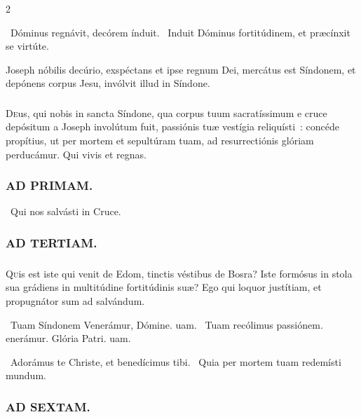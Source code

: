 \documentclass[9pt,twoside]{extarticle}
\begin{document}
\begin{multicols}{2}
\begin{tightlist}{}
\item {}~Dóminus regnávit, decórem índuit. ~Induit Dóminus fortitúdinem, et præcínxit se virtúte.
\item {} Joseph nóbilis decúrio, exspéctans et ipse regnum Dei, mercátus est Síndonem, et depónens corpus Jesu, invólvit illud in Síndone.
\end{tightlist}

\subsubsection*{\center {}}
\lettrine{D}eus, qui nobis in sancta Síndone, qua corpus tuum sacratíssimum e cruce depósitum a Joseph involútum fuit, passiónis tuæ vestígia reliquísti~: concéde propítius, ut per mortem et sepultúram tuam, ad resurrectiónis glóriam perducámur. Qui vivis et regnas.

\subsubsection*{\center \textsc{AD PRIMAM.}}
\noindent {}~Qui nos salvásti in Cruce.

\subsubsection*{\center \textsc{AD TERTIAM.}}
\subsubsection*{}
\lettrine{Q}uis est iste qui venit de Edom, tinctis véstibus de Bosra? Iste formósus in stola sua grádiens in multitúdine fortitúdinis suæ? Ego qui loquor justítiam, et propugnátor sum ad salvándum.

\begin{tightlist}{}
\item {}~Tuam Síndonem \textred{*} Venerámur, Dómine. uam. ~Tuam recólimus passiónem. enerámur. Glória Patri. uam.
\item {}~Adorámus te Christe, et benedícimus tibi. ~Quia per mortem tuam redemísti mundum.
\end{tightlist}

\subsubsection*{\center \textsc{AD SEXTAM.}}

\end{multicols}
\end{document}
